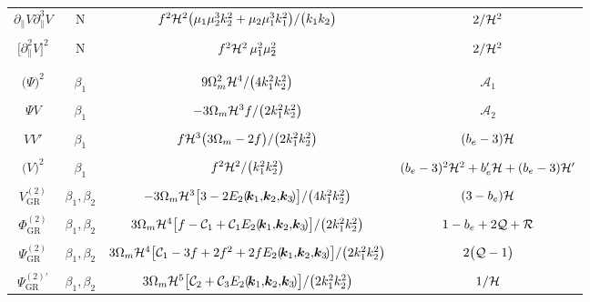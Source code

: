 \begin{landscape}
\begin{longtable}{| c | c | c | c |}
$\partial_{\parallel}V \partial_{\parallel}^{3}V $  & N & $f^{2} \mathcal{H}^2{{\big(\mu_{1}\mu_{2}^{3}k_{2}^{2} + \mu_{2}\mu_{1}^{3}k_{1}^{2}\big)}/{\big(k_{1}k_{2}\big)}}$ & $ {2}/{\mathcal{H}^{2}}$  \\
&  &  & \\ 
$\big[\partial_{\parallel}^{2}V\big]^{2}$  & N &$f^{2}\mathcal{H}^2 \,\mu_{1}^{2}\mu_{2}^{2}$ & ${2}/{\mathcal{H}^{2}}$ \\ 
&  &  & \\
\hline 
&  &  & \\
$\big(\Psi\big)^{2}$ & $\beta_{1}$ & ${9}\Omega_{m}^{2}\mathcal{H}^{4}/{\big(4k_{1}^{2}k_{2}^{2}\big)}$ & $\mathcal{A}_{1}$ \\ 
&  &  & \\
${\Psi V}$ & $\beta_{1}$ & $-{3}\Omega_{m}\mathcal{H}^{3}f/{\big(2k_{1}^{2}k_{2}^{2}\big)}$  & $\mathcal{A}_{2}$ \\ 
&  &  & \\
$VV' $ & $\beta_{1}$  & ${ f\mathcal{H}^{3}\big(3\Omega_{m}-2f\big)/{\big(2k_{1}^{2}k_{2}^{2}\big)} }$ & $ (b_{e}-3)\mathcal{H}$ \\ 
&  &  & \\
$\big(V\big)^{2}$ & $\beta_{1}$ & $f^{2} \mathcal{H}^{2}/{\big(k_{1}^{2}k_{2}^{2}\big)}$ & $(b_{e}-3)^{2}\mathcal{H}^2+{b_{e}'\mathcal{H}} +(b_{e}-3){\mathcal{H}'} $ \\ 
&  &  & \\
${V^{(2)}_{\mathrm{GR}}}$ & $\beta_1,\beta_2$ & $-3\Omega_{m}\mathcal{H}^{3}\big[3 -2 E_{2}(\!\bm{k}_{1},\!\bm{k}_{2},\!\bm{k}_{3}\!)\big]/\big(4k_{1}^{2}k_{2}^{2}\big)$ & $(3-b_{e})\mathcal{H}$ \\
&  &  & \\
${\Phi^{(2)}_{\mathrm{GR}}}$ & $\beta_1,\beta_2$ & $3\Omega_{m}\mathcal{H}^{4}\big[{f-\mathcal{C}_1 + \mathcal{C}_1} E_{2}(\!\bm{k}_{1},\!\bm{k}_{2},\!\bm{k}_{3}\!)\big]/\big(2k_{1}^{2}k_{2}^{2}\big)$ & $1-b_e+2\mathcal{Q}+\mathcal{R}$ \\
&  &  & \\
${\Psi^{(2)}_{\mathrm{GR}}}$ & $\beta_1,\beta_2$ & $3\Omega_{m}\mathcal{H}^{4}\big[{\mathcal{C}_1-3f+2f^2 +2 f} E_{2}(\!\bm{k}_{1},\!\bm{k}_{2},\!\bm{k}_{3}\!)\big]/\big(2k_{1}^{2}k_{2}^{2}\big)$ & $2\big(\mathcal{Q} - 1\big)$ \\
&  &  & \\
${\Psi^{(2)\prime}_{\mathrm{GR}}}$ & $\beta_1,\beta_2$ & $3\Omega_{m}\mathcal{H}^{5}\big[{\mathcal{C}_2 +  \mathcal{C}_{3}} E_{2}(\!\bm{k}_{1},\!\bm{k}_{2},\!\bm{k}_{3}\!)\big]/\big(2k_{1}^{2}k_{2}^{2}\big)$ & ${1}/{\mathcal{H}}$ \\

\end{longtable}
\end{landscape}
